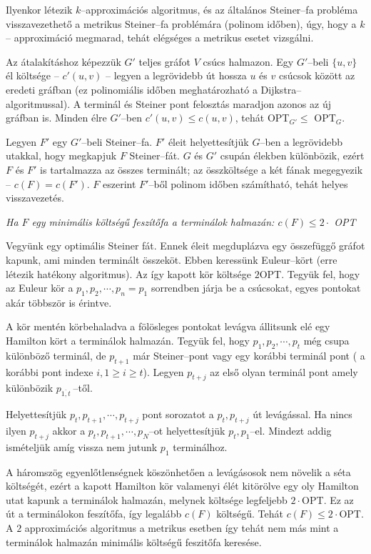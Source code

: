 Ilyenkor létezik $k$--approximációs algoritmus, és az általános Steiner--fa
probléma visszavezethető a metrikus Steiner--fa problémára (polinom időben),
úgy, hogy a $k$-- approximáció megmarad, tehát elégséges a metrikus esetet
vizsgálni.

Az átalakításhoz képezzük $G'$ teljes gráfot $V$ csúcs halmazon. Egy $G'$--beli
$\{u,v\}$ él költsége -- $c'(u,v)$ -- legyen a legrövidebb út hossza $u$ és $v$
csúcsok között az eredeti gráfban (ez polinomiális időben meghatározható a
Dijkstra--algoritmussal). A terminál és Steiner pont felosztás maradjon azonos
az új gráfban is. Minden élre $G'$--ben $c'(u,v) \leq c(u,v)$, tehát OPT$_{G'}
	\leq$ OPT$_{G}$.

Legyen $F'$ egy $G'$--beli Steiner--fa. $F'$ éleit helyettesítjük $G$--ben a
legrövidebb utakkal, hogy megkapjuk $F$ Steiner--fát. $G$ és $G'$ csupán élekben
különbözik, ezért $F$ és $F'$ is tartalmazza az összes terminált; az
összköltsége a két fának megegyezik -- $c(F)=c(F')$. $F$ eszerint $F'$--ből
polinom időben számítható, tehát helyes visszavezetés.

\vspace{0.4cm}
\emph{Ha $F$ egy minimális költségű feszítőfa a terminálok halmazán:
	$c(F) \leq  2 \cdot $ OPT}
\vspace{0.4cm}

Vegyünk egy optimális Steiner fát. Ennek éleit megduplázva egy összefüggő
gráfot kapunk, ami minden terminált összeköt. Ebben keressünk Euleur--kört
(erre létezik hatékony algoritmus). Az így  kapott kör költsége $2$OPT.
Tegyük fel, hogy az Euleur kör a $p_1, p_2, \cdots, p_n=p_1$ sorrendben járja
be a csúcsokat, egyes pontokat akár többször is érintve.

A kör mentén körbehaladva a fölösleges pontokat levágva állitsunk elé egy
Hamilton kört a terminálok halmazán. Tegyük fel, hogy $p_1, p_2, \cdots, p_t$
még csupa különböző terminál, de $p_{t+1}$ már Steiner--pont vagy egy korábbi
terminál pont ( a korábbi pont indexe $i, 1 \geq i \geq t$). Legyen $p_{t+j}$ az
első olyan terminál pont amely különbözik $p_{\overline{1,t}}~$--től.

Helyettesítjük $p_t, p_{t+1}, \cdots, p_{t+j}$ pont sorozatot a $p_t, p_{t+j}$
út levágással. Ha nincs ilyen $p_{t+j}$ akkor a $p_t, p_{t+1}, \cdots, p_N$--ot
helyettesítjük $p_t,p_1$--el. Mindezt addig ismételjük amíg vissza nem jutunk
$p_1$ terminálhoz.

A háromszög egyenlőtlenségnek köszönhetően a levágásosok nem növelik a séta
költségét, ezért a kapott Hamilton kör valamenyi élét kitörölve egy oly
Hamilton utat kapunk a terminálok halmazán, melynek költsége legfeljebb
$2\cdot$OPT. Ez az út a terminálokon feszítőfa, így legalább $c(F)$ költségű.
Tehát $c(F) \leq 2 \cdot$OPT. A $2$ approximációs algoritmus a metrikus esetben
így tehát nem más mint a terminálok halmazán minimális költségű feszitőfa
keresése.

